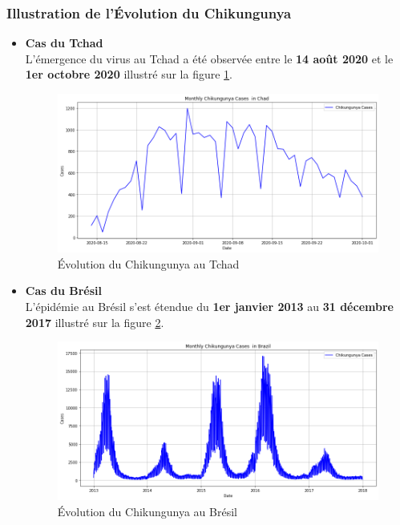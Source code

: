 \subsubsection*{Illustration de l'Évolution du Chikungunya}
\begin{itemize}
	\item \textbf{Cas du Tchad}\\
	L'émergence du virus au Tchad a été observée entre le \textbf{14 août 2020} et le \textbf{1er octobre 2020} illustré sur la figure \ref{fig:casechad}.
	\begin{figure}[h!]
		\centering
		\includegraphics[width=0.9\linewidth]{images/case_chad}
		\caption[Évolution du Chikungunya au Tchad]{Évolution du Chikungunya au Tchad}
		\label{fig:casechad}
	\end{figure}
	
	\item \textbf{Cas du Brésil}\\
	L'épidémie au Brésil s'est étendue du \textbf{1er janvier 2013} au \textbf{31 décembre 2017} illustré sur la figure \ref{fig:casebrazil}.
	\begin{figure}[h!]
		\centering
		\includegraphics[width=0.9\linewidth]{images/case_brazil}
		\caption[Évolution du Chikungunya au Brésil]{Évolution du Chikungunya au Brésil}
		\label{fig:casebrazil}
	\end{figure}
	

\end{itemize}
